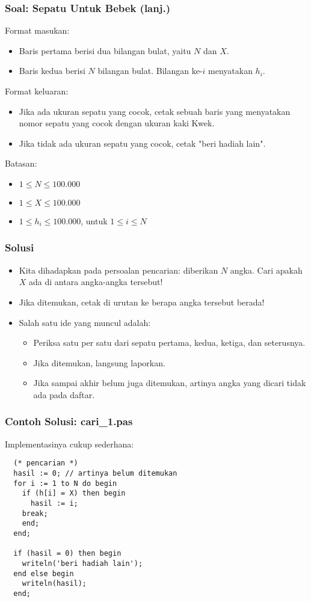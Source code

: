 \documentclass{beamer}
\begin{document}
\begin{frame}
\frametitle{Soal: Sepatu Untuk Bebek (lanj.)}
Format masukan:
\begin{itemize}
  \item Baris pertama berisi dua bilangan bulat, yaitu $N$ dan $X$.
  \item Baris kedua berisi $N$ bilangan bulat. Bilangan ke-$i$ menyatakan $h_i$.
\end{itemize}
Format keluaran:
\begin{itemize}
  \item Jika ada ukuran sepatu yang cocok, cetak sebuah baris yang menyatakan nomor sepatu yang cocok dengan ukuran kaki Kwek.
  \item Jika tidak ada ukuran sepatu yang cocok, cetak "beri hadiah lain".
\end{itemize}
Batasan:
\begin{itemize}
  \item $1 \le N \le 100.000$
  \item $1 \le X \le 100.000$
  \item $1 \le h_i \le 100.000$, untuk $1 \le i \le N$
\end{itemize}
\end{frame}

\begin{frame}
\frametitle{Solusi}
\begin{itemize}
  \item Kita dihadapkan pada persoalan pencarian: diberikan $N$ angka. Cari apakah $X$ ada di antara angka-angka tersebut!
  \item Jika ditemukan, cetak di urutan ke berapa angka tersebut berada!
  \item Salah satu ide yang muncul adalah:
  \begin{itemize}
    \item Periksa satu per satu dari sepatu pertama, kedua, ketiga, dan seterusnya.
    \item Jika ditemukan, langsung laporkan.
    \item Jika sampai akhir belum juga ditemukan, artinya angka yang dicari tidak ada pada daftar.
  \end{itemize}
\end{itemize}
\end{frame}

\begin{frame}[fragile]
\frametitle{Contoh Solusi: cari\_1.pas}
Implementasinya cukup sederhana:
\begin{lstlisting}
  (* pencarian *)
  hasil := 0; // artinya belum ditemukan
  for i := 1 to N do begin
    if (h[i] = X) then begin
      hasil := i;
    break;
    end;
  end;

  if (hasil = 0) then begin
    writeln('beri hadiah lain');
  end else begin
    writeln(hasil);
  end;
\end{lstlisting}
\end{frame}
\end{document}
